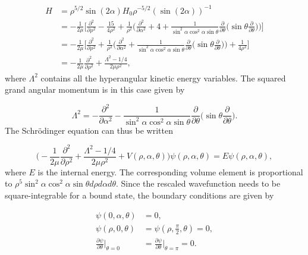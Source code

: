 \begin{align}
H&= \rho^{5/2}\sin(2\alpha) H_0 \rho^{-5/2}(\sin(2\alpha))^{-1}\nonumber\\
&= -\frac{1}{2\mu} \bigg[ \frac{\partial^2}{\partial\rho^2} - \frac{15}{4\rho^2} + \frac{1}{\rho^2}\bigg( \frac{\partial^2}{\partial\alpha^2} + 4 + \frac{1}{\sin^2\alpha\cos^2\alpha\sin\theta} \frac{\partial}{\partial\theta} \bigg( \sin\theta \frac{\partial}{\partial\theta} \bigg) \bigg) \bigg]\nonumber\\
&= -\frac{1}{2\mu} \bigg[ \frac{\partial^2}{\partial\rho^2} + \frac{1}{\rho^2}\bigg( \frac{\partial^2}{\partial\alpha^2} + \frac{1}{\sin^2\alpha\cos^2\alpha\sin\theta} \frac{\partial}{\partial\theta} \bigg( \sin\theta \frac{\partial}{\partial\theta} \bigg) \bigg) + \frac{1}{4\rho^2} \bigg]\nonumber\\
&= -\frac{1}{2\mu}\frac{\partial^2}{\partial\rho^2} + \frac{\Lambda^2 - 1/4}{2\mu\rho^2},
\end{align}   
where $\Lambda^2$ contains all the hyperangular kinetic energy variables. The squared grand angular momentum is in this case given by 

\begin{equation}
\Lambda^2 = -\frac{\partial^2}{\partial\alpha^2} - \frac{1}{\sin^2\alpha\cos^2\alpha\sin\theta} \frac{\partial}{\partial\theta} \bigg( \sin\theta \frac{\partial}{\partial\theta}\bigg).
\end{equation}
The Schr{\"o}dinger equation can thus be written

\begin{equation}
\bigg(-\frac{1}{2\mu}\frac{\partial^2}{\partial\rho^2} + \frac{\Lambda^2 - 1/4}{2\mu\rho^2} + V(\rho,\alpha,\theta)\bigg) \psi(\rho,\alpha,\theta) = E \psi(\rho,\alpha,\theta),
\end{equation}
where $E$ is the internal energy. The corresponding volume element is proportional to $\rho^5\sin^2\alpha\cos^2\alpha\sin\theta d\rho d\alpha d\theta$. Since the rescaled wavefunction needs to be square-integrable for a bound state, the boundary conditions are given by

\begin{align}
	\psi(0,\alpha,\theta) &= 0,\\
	\psi(\rho,0,\theta)    &= \psi(\rho,\frac{\pi}{2},\theta) = 0,\\
	\frac{\partial\psi}{\partial\theta}\bigg\rvert_{\theta = 0} &= \frac{\partial\psi}{\partial\theta}\bigg\rvert_{\theta = \pi} = 0.
\end{align}   